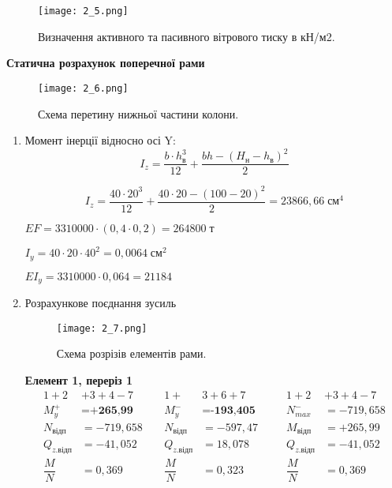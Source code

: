 \documentclass[a4paper,14pt]{article}
\begin{document}
\begin{figure}[h!]
    \begin{center}
        \texttt{[image: 2\_5.png]}
        \caption{Визначення активного та пасивного вітрового тиску в кН/м2.}\label{ris2_5} 
    \end{center}
\end{figure}
\textbf{Статична розрахунок поперечної рами} 
\begin{figure}[h!]
    \begin{center}
        \texttt{[image: 2\_6.png]}
        \caption{Схема перетину нижньої частини колони.}\label{ris2_6} 
    \end{center}
\end{figure}
\begin{enumerate}
    \item Момент інерції відносно осі Y:
    \begin{equation}
        I_z = \dfrac{b\cdot h^3_\textit{в}}{12}+\dfrac{bh-(H_\textit{н}-h_\textit{в})^2}{2} 
    \end{equation}
    
    $$I_z = \dfrac{40\cdot 20^3}{12}+\dfrac{40\cdot 20-(100-20)^2}{2}=23866,66\;\textit{см}^4$$

    $EF=3310000\cdot (0,4\cdot 0,2) = 264800\;\textit{т}$

    $I_y = 40 \cdot 20\cdot 40^2 = 0,0064\;\textit{см}^2$

    $EI_y = 3310000\cdot 0,064 = 21184$

    \item Розрахункове поєднання зусиль
        \begin{figure}[h!]
        \begin{center}
            \texttt{[image: 2\_7.png]}
            \caption{Схема розрізів елементів рами.}\label{ris2_7} 
        \end{center}
    \end{figure}

    \textbf{Елемент 1, переріз 1}
    \begin{equation*}
        \begin{aligned}
        1+2&+3+4-7\qquad  &1+&3+6+7 &1+2&+3+4-7\\
        M^+_y &= \textbf{+265,99} &M^-_y &= \textbf{-193,405}\qquad &N^-_{max} &= -719,658\\
        N_\textit{відп} &= -719,658  &N_\textit{відп} &= -597,47 &M_\textit{відп} &= +265,99 \\
        Q_\textit{z.відп} &= -41,052 &Q_\textit{z.відп} &= 18,078 &Q_\textit{z.відп} &= -41,052 \\
        \dfrac{M}{N}&=0,369  &\dfrac{M}{N}&=0,323 &\dfrac{M}{N}&=0,369 
        \end{aligned}
    \end{equation*}
 

\end{enumerate}
\end{document}
